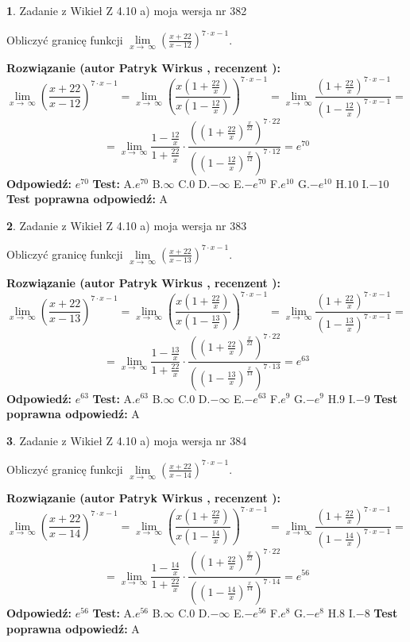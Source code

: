 \documentclass[12pt, a4paper]{article}
\theoremstyle{definition} %
\newtheorem{zad}{}
\newcommand{\zadStart}[1]{\begin{zad}#1\newline}
\newcommand{\zadStop}{\end{zad}}
\newcommand{\rozwStart}[2]{\noindent \textbf{Rozwiązanie (autor #1 , recenzent #2): }\newline}
\newcommand{\rozwStop}{\newline}
\newcommand{\odpStart}{\noindent \textbf{Odpowiedź:}\newline}
\newcommand{\odpStop}{\newline}
\newcommand{\testStart}{\noindent \textbf{Test:}\newline}
\newcommand{\testStop}{\newline}
\newcommand{\kluczStart}{\noindent \textbf{Test poprawna odpowiedź:}\newline}
\newcommand{\kluczStop}{\newline}
\begin{document}
\zadStart{Zadanie z Wikieł Z 4.10 a) moja wersja nr 382}

Obliczyć granicę funkcji  $\lim\limits_{x\to\ \infty}(\frac{x+22}{x-12})^{7\cdot x-1}$.
\zadStop
\rozwStart{Patryk Wirkus}{}
$$\lim\limits_{x\to\ \infty}(\frac{x+22}{x-12})^{7\cdot x-1} = \lim\limits_{x\to\ \infty}(\frac{x(1+\frac{22}{x})}{x(1-\frac{12}{x})})^{7\cdot x-1}=\lim\limits_{x\to\ \infty}\frac{(1+\frac{22}{x})^{7\cdot x-1}}{(1-\frac{12}{x})^{7\cdot x-1}}=$$
$$=\lim\limits_{x\to\ \infty}\frac{1-\frac{12}{x}}{1+\frac{22}{x}}\cdot\frac{((1+\frac{22}{x})^{\frac{x}{22}})^{7\cdot22}}{((1-\frac{12}{x})^{\frac{x}{12}})^{7\cdot12}}=e^{70}$$
\rozwStop
\odpStart
$e^{70}$
\odpStop
\testStart
A.$e^{70}$ B.$\infty$ C.$0$ D.$-\infty$ E.$-e^{70}$
F.$e^{10}$ G.$-e^{10}$
H.$10$
I.$-10$
\testStop
\kluczStart
A
\kluczStop



\zadStart{Zadanie z Wikieł Z 4.10 a) moja wersja nr 383}

Obliczyć granicę funkcji  $\lim\limits_{x\to\ \infty}(\frac{x+22}{x-13})^{7\cdot x-1}$.
\zadStop
\rozwStart{Patryk Wirkus}{}
$$\lim\limits_{x\to\ \infty}(\frac{x+22}{x-13})^{7\cdot x-1} = \lim\limits_{x\to\ \infty}(\frac{x(1+\frac{22}{x})}{x(1-\frac{13}{x})})^{7\cdot x-1}=\lim\limits_{x\to\ \infty}\frac{(1+\frac{22}{x})^{7\cdot x-1}}{(1-\frac{13}{x})^{7\cdot x-1}}=$$
$$=\lim\limits_{x\to\ \infty}\frac{1-\frac{13}{x}}{1+\frac{22}{x}}\cdot\frac{((1+\frac{22}{x})^{\frac{x}{22}})^{7\cdot22}}{((1-\frac{13}{x})^{\frac{x}{13}})^{7\cdot13}}=e^{63}$$
\rozwStop
\odpStart
$e^{63}$
\odpStop
\testStart
A.$e^{63}$ B.$\infty$ C.$0$ D.$-\infty$ E.$-e^{63}$
F.$e^{9}$ G.$-e^{9}$
H.$9$
I.$-9$
\testStop
\kluczStart
A
\kluczStop



\zadStart{Zadanie z Wikieł Z 4.10 a) moja wersja nr 384}

Obliczyć granicę funkcji  $\lim\limits_{x\to\ \infty}(\frac{x+22}{x-14})^{7\cdot x-1}$.
\zadStop
\rozwStart{Patryk Wirkus}{}
$$\lim\limits_{x\to\ \infty}(\frac{x+22}{x-14})^{7\cdot x-1} = \lim\limits_{x\to\ \infty}(\frac{x(1+\frac{22}{x})}{x(1-\frac{14}{x})})^{7\cdot x-1}=\lim\limits_{x\to\ \infty}\frac{(1+\frac{22}{x})^{7\cdot x-1}}{(1-\frac{14}{x})^{7\cdot x-1}}=$$
$$=\lim\limits_{x\to\ \infty}\frac{1-\frac{14}{x}}{1+\frac{22}{x}}\cdot\frac{((1+\frac{22}{x})^{\frac{x}{22}})^{7\cdot22}}{((1-\frac{14}{x})^{\frac{x}{14}})^{7\cdot14}}=e^{56}$$
\rozwStop
\odpStart
$e^{56}$
\odpStop
\testStart
A.$e^{56}$ B.$\infty$ C.$0$ D.$-\infty$ E.$-e^{56}$
F.$e^{8}$ G.$-e^{8}$
H.$8$
I.$-8$
\testStop
\kluczStart
A
\kluczStop
\end{document}

